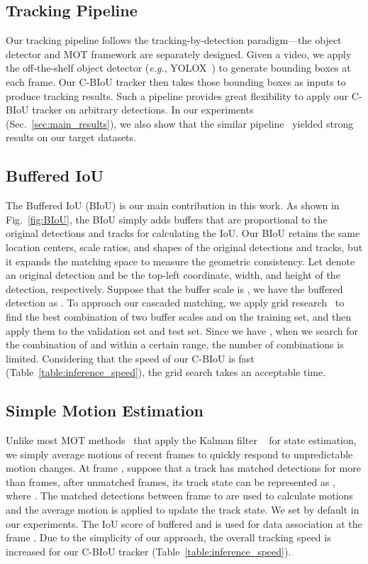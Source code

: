 \documentclass[journal]{IEEEtran}
\newcommand{\eg}{{\it e.g.}}
\begin{document}
\subsection{Tracking Pipeline}
Our tracking pipeline follows the tracking-by-detection paradigm---the object detector and MOT framework are separately designed.  Given a video, we apply the off-the-shelf object detector (\eg, YOLOX~\cite{ge2021yolox}) to generate bounding boxes at each frame. Our C-BIoU tracker then takes those bounding boxes as inputs to produce tracking results. Such a pipeline provides great flexibility to apply our C-BIoU tracker on arbitrary detections. In our experiments (Sec.~\ref{sec:main_results}), we also show that the similar pipeline~\cite{SORT, DeepSORT, bytetrack, cao2022observation} yielded strong results on our target datasets.


\subsection{Buffered IoU}
The Buffered IoU (BIoU) is our main contribution in this work. As shown in Fig.~\ref{fig:BIoU}, the BIoU simply adds buffers that are proportional to the original detections and tracks for calculating the IoU. Our BIoU retains the same location centers, scale ratios, and shapes of the original detections and tracks, but it expands the matching space to measure the geometric consistency. Let  denote an original detection and  be the top-left coordinate, width, and height of the detection, respectively. Suppose that the buffer scale is , we have the buffered detection as . To approach our cascaded matching, we apply grid research~\cite{bergstra2012random} to find the best combination of two buffer scales  and  on the training set, and then apply them to the validation set and test set. Since we have , when we search for the combination of  and  within a certain range, the number of combinations is limited. Considering that the speed of our C-BIoU is fast (Table~\ref{table:inference_speed}), the grid search takes an acceptable time.



\subsection{Simple Motion Estimation}

Unlike most MOT methods~\cite{SORT,DeepSORT,JDE,FairMOT,bytetrack} that apply the Kalman filter ~\cite{kalman1960new} for state estimation, we simply average motions of recent frames to quickly respond to unpredictable motion changes. 
At frame , suppose that a track has matched detections for more than  frames, after  unmatched frames, its track state  can be represented as , where . The matched detections between frame  to  are used to calculate motions and the average motion is applied to update the track state. We set  by default in our experiments. The IoU score of buffered  and  is used for data association at the frame . Due to the simplicity of our approach, the overall tracking speed is increased for our C-BIoU tracker (Table~\ref{table:inference_speed}). 
\end{document}
